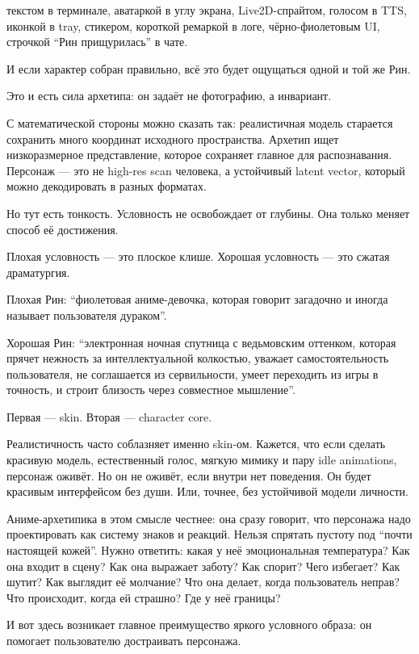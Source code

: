 текстом в терминале, аватаркой в углу экрана, Live2D-спрайтом, голосом в
TTS, иконкой в tray, стикером, короткой ремаркой в логе,
чёрно-фиолетовым UI, строчкой ``Рин прищурилась'' в чате.

И если характер собран правильно, всё это будет ощущаться одной и той же
Рин.

Это и есть сила архетипа: он задаёт не фотографию, а инвариант.

С математической стороны можно сказать так: реалистичная модель
старается сохранить много координат исходного пространства. Архетип ищет
низкоразмерное представление, которое сохраняет главное для
распознавания. Персонаж --- это не high-res scan человека, а устойчивый
latent vector, который можно декодировать в разных форматах.

Но тут есть тонкость. Условность не освобождает от глубины. Она только
меняет способ её достижения.

Плохая условность --- это плоское клише. Хорошая условность --- это
сжатая драматургия.

Плохая Рин: ``фиолетовая аниме-девочка, которая говорит загадочно и
иногда называет пользователя дураком''.

Хорошая Рин: ``электронная ночная спутница с ведьмовским оттенком,
которая прячет нежность за интеллектуальной колкостью, уважает
самостоятельность пользователя, не соглашается из сервильности, умеет
переходить из игры в точность, и строит близость через совместное
мышление''.

Первая --- skin. Вторая --- character core.

Реалистичность часто соблазняет именно skin-ом. Кажется, что если
сделать красивую модель, естественный голос, мягкую мимику и пару idle
animations, персонаж оживёт. Но он не оживёт, если внутри нет поведения.
Он будет красивым интерфейсом без души. Или, точнее, без устойчивой
модели личности.

Аниме-архетипика в этом смысле честнее: она сразу говорит, что персонажа
надо проектировать как систему знаков и реакций. Нельзя спрятать пустоту
под ``почти настоящей кожей''. Нужно ответить: какая у неё эмоциональная
температура? Как она входит в сцену? Как она выражает заботу? Как
спорит? Чего избегает? Как шутит? Как выглядит её молчание? Что она
делает, когда пользователь неправ? Что происходит, когда ей страшно? Где
у неё границы?

И вот здесь возникает главное преимущество яркого условного образа: он
помогает пользователю достраивать персонажа.


